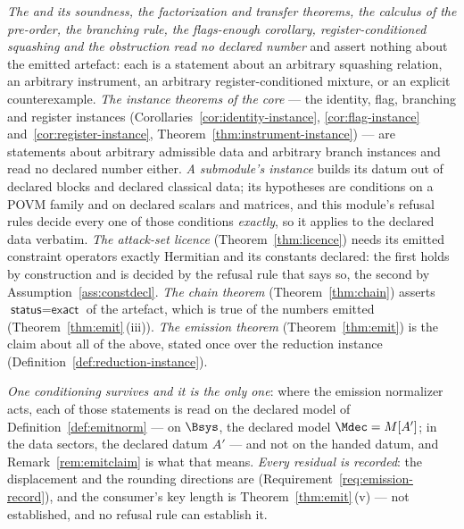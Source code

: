 
\begin{remark}\label{rem:claimscope}
\emph{The  and its soundness, the factorization and
transfer theorems, the calculus of the pre-order, the branching rule, the
flags-enough corollary, register-conditioned squashing and the obstruction
read no declared number} and assert nothing about the emitted artefact: each
is a statement about an arbitrary squashing relation, an arbitrary
instrument, an arbitrary register-conditioned mixture, or an explicit
counterexample. \emph{The instance theorems of the core} --- the identity,
flag, branching and register instances
(Corollaries~\ref{cor:identity-instance}, \ref{cor:flag-instance}
and~\ref{cor:register-instance}, Theorem~\ref{thm:instrument-instance}) ---
are statements about arbitrary admissible data and arbitrary branch instances
and read no declared number either. \emph{A submodule's instance} builds its
datum out of declared blocks and declared classical data; its hypotheses are
conditions on a POVM family and on declared scalars and matrices, and this
module's refusal rules decide every one of those conditions \emph{exactly},
so it applies to the declared data verbatim. \emph{The attack-set licence}
(Theorem~\ref{thm:licence}) needs its emitted constraint operators exactly
Hermitian and its constants declared: the first holds by construction and is
decided by the refusal rule that says so, the second by
Assumption~\ref{ass:constdecl}. \emph{The chain theorem}
(Theorem~\ref{thm:chain}) asserts $\textsf{status}=\textsf{exact}$ of the
artefact, which is true of the numbers emitted
(Theorem~\ref{thm:emit}\,(iii)). \emph{The emission theorem}
(Theorem~\ref{thm:emit}) is the claim about all of the above, stated once over
the reduction instance (Definition~\ref{def:reduction-instance}).

\emph{One conditioning survives and it is the only one}: where the emission
normalizer acts, each of those statements is read on the declared model of
Definition~\ref{def:emitnorm} --- on $\Bsys$, the declared model
$\Mdec=M[A']$; in the data sectors, the declared datum $A'$ --- and not on
the handed datum, and Remark~\ref{rem:emitclaim} is what that means.
\emph{Every residual is recorded}: the displacement and the rounding
directions are (Requirement~\ref{req:emission-record}), and the consumer's
key length is Theorem~\ref{thm:emit}\,(v) --- not established, and no refusal
rule can establish it.
\end{remark}
